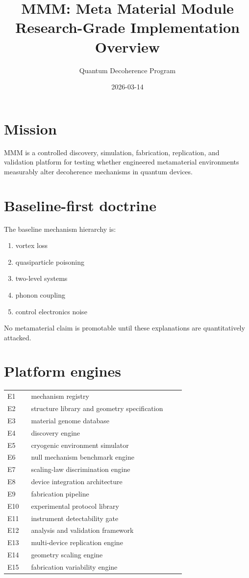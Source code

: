 \documentclass[11pt]{article}
\title{MMM: Meta Material Module\\Research-Grade Implementation Overview}
\author{Quantum Decoherence Program}
\date{2026-03-14}
\begin{document}
\maketitle

\section*{Mission}
MMM is a controlled discovery, simulation, fabrication, replication, and validation platform for testing whether engineered metamaterial environments measurably alter decoherence mechanisms in quantum devices.

\section*{Baseline-first doctrine}
The baseline mechanism hierarchy is:
\begin{enumerate}
    \item vortex loss
    \item quasiparticle poisoning
    \item two-level systems
    \item phonon coupling
    \item control electronics noise
\end{enumerate}
No metamaterial claim is promotable until these explanations are quantitatively attacked.

\section*{Platform engines}
\begin{longtable}{p{0.12\linewidth} p{0.78\linewidth}}
E1 & mechanism registry \\
E2 & structure library and geometry specification \\
E3 & material genome database \\
E4 & discovery engine \\
E5 & cryogenic environment simulator \\
E6 & null mechanism benchmark engine \\
E7 & scaling-law discrimination engine \\
E8 & device integration architecture \\
E9 & fabrication pipeline \\
E10 & experimental protocol library \\
E11 & instrument detectability gate \\
E12 & analysis and validation framework \\
E13 & multi-device replication engine \\
E14 & geometry scaling engine \\
E15 & fabrication variability engine \\
\end{longtable}
\end{document}
